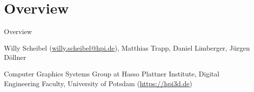 
\section{Overview}

\begin{frame}{Overview}
	\vspace{-1em}
	\centering\Large\inserttitle\normalsize\par
	\smallskip
	\centering Willy Scheibel (\url{willy.scheibel@hpi.de}), Matthias Trapp, Daniel Limberger, Jürgen Döllner\par
	\smallskip
	\centering\footnotesize Computer Graphics Systems Group at Hasso Plattner Institute, Digital Engineering Faculty, University of Potsdam (\url{https://hpi3d.de})\par
	
\end{frame}
